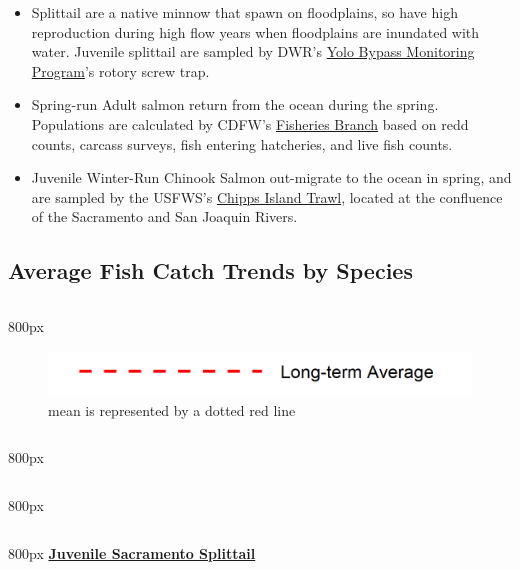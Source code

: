 \documentclass[
]{book}
\providecommand{\tightlist}{%
  \setlength{\itemsep}{0pt}\setlength{\parskip}{0pt}}
\begin{document}
\begin{itemize}
\tightlist
\item
  Splittail are a native minnow that spawn on floodplains, so have high reproduction during high flow years when floodplains are inundated with water. Juvenile splittail are sampled by DWR's \href{https://portal.edirepository.org/nis/mapbrowse?packageid=edi.233.2}{Yolo Bypass Monitoring Program}'s rotory screw trap.
\item
  Spring-run Adult salmon return from the ocean during the spring. Populations are calculated by CDFW's \href{http://www.cbr.washington.edu/sacramento/data/query_adult_grandtab.html}{Fisheries Branch} based on redd counts, carcass surveys, fish entering hatcheries, and live fish counts.
\item
  Juvenile Winter-Run Chinook Salmon out-migrate to the ocean in spring, and are sampled by the USFWS's \href{https://www.fws.gov/lodi/juvenile_fish_monitoring_program/jfmp_index.htm}{Chipps Island Trawl}, located at the confluence of the Sacramento and San Joaquin Rivers.
\end{itemize}

\hypertarget{average-fish-catch-trends-by-species}{%
\subsection{Average Fish Catch Trends by Species}\label{average-fish-catch-trends-by-species}}

\begin{column}{800px\textwidth}
\begin{figure}
\includegraphics[width=15.25in]{figures/mline} \caption{mean is represented by a dotted red line}\label{fig:unnamed-chunk-31}
\end{figure}
\end{column}

\begin{column}{800px\textwidth}
\end{column}

\begin{column}{800px\textwidth}
\end{column}

\begin{column}{800px\textwidth}
\textbf{\href{http://calfish.ucdavis.edu/species/?uid=136\&ds=698}{Juvenile Sacramento Splittail}}
\end{column}
\end{document}
